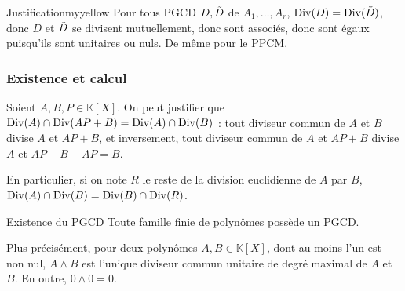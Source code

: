     \begin{demo}{Justification}{myyellow}
        Pour tous PGCD $D, \Tilde{D}$ de $A_1, \ldots, A_r$, $\operatorname{Div}(D) = \operatorname{Div}(\Tilde{D})$, donc $D$ et $\Tilde{D}$ se divisent mutuellement, donc sont associés, donc sont égaux puisqu’ils sont unitaires ou nuls. De même pour le PPCM.
    \end{demo}

    \subsubsection{Existence et calcul}

    Soient $A,B,P \in \mathbb{K}[X]$. On peut justifier que $\operatorname{Div}(A) \cap \operatorname{Div}(AP + B) = \operatorname{Div}(A) \cap \operatorname{Div}(B)$ : tout diviseur commun de $A$ et $B$ divise $A$ et $AP + B$, et inversement, tout diviseur commun de $A$ et $AP+B$ divise $A$ et $AP+B - AP= B$.

    En particulier, si on note $R$ le reste de la division euclidienne de $A$ par $B$, $\operatorname{Div}(A) \cap \operatorname{Div}(B) = \operatorname{Div}(B) \cap \operatorname{Div}(R)$.

    \begin{theo}{Existence du PGCD}{}
        Toute famille finie de polynômes possède un PGCD.

        Plus précisément, pour deux polynômes $A,B \in \mathbb{K}[X]$, dont au moins l’un est non nul, $A \wedge B$ est l’unique diviseur commun unitaire de degré maximal de $A$ et $B$. En outre, $0 \wedge 0 = 0$.
    \end{theo}

